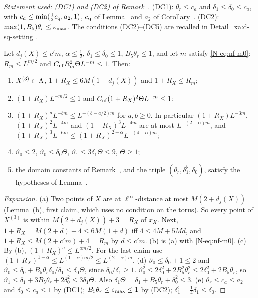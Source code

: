 \begin{detail}\label{xb:d-nf-small}
\emph{Statement used: (DC1) and (DC2) of Remark~.} (DC1): $\theta_r\le c_a$ and $\delta_1\le\delta_0\le c_a$, with $c_a\le\min(\frac12c_{\rm q},a_2,1)$, $c_{\rm q}$ of Lemma~ and $a_2$ of Corollary~. (DC2): $\max(1,B_5)\theta_r\le\varepsilon_{\max}$. The conditions (DC2)--(DC5) are recalled in Detail~\ref{xa:d-sq-setting}.

Let $d_j(X)\le c'm$, $\alpha\le\frac12$, $\delta_1\le\delta_0\le1$, $B_5\theta_r\le1$, and let $m$ satisfy \eqref{N-eq:nf-m0}: $R_m\le L^{m/2}$ and $C_{\rm nf}R_m^2\Theta L^{-m}\le1$. Then:
\begin{enumerate}[label=(\alph*)]
\item $X^{(3)}\subset\Lambda$, $1+R_X\le6M(1+d_j(X))$ and $1+R_X\le R_m$;
\item $(1+R_X)L^{-m/2}\le1$ and $C_{\rm nf}(1+R_X)^2\Theta L^{-m}\le1$;
\item $(1+R_X)^aL^{-bm}\le L^{-(b-a/2)m}$ for $a,b\ge0$. In particular $(1+R_X)L^{-3m}$, $(1+R_X)^2L^{-4m}$ and $(1+R_X)^3L^{-4m}$ are at most $L^{-(2+\alpha)m}$, and $(1+R_X)^3L^{-6m}\le(1+R_X)^{2+\alpha}L^{-(4+\alpha)m}$;
\item $\vartheta_0\le2$, $\vartheta_0\le\delta_0\Theta$, $\vartheta_1\le3\delta_1\Theta\le9$, $\Theta\ge1$;
\item the domain constants of Remark~, and the triple $(\theta_r,\delta_1^\flat,\delta_0)$, satisfy the hypotheses of Lemma~.
\end{enumerate}
\end{detail}

\begin{proof}[Expansion]
(a) Two points of $X$ are at $\ell^\infty$-distance at most $M(2+d_j(X))$ (Lemma~(b), first claim, which uses no condition on the torus). So every point of $X^{(3)}$ is within $M(2+d_j(X))+3=R_X$ of $x_X$. Next, $1+R_X=M(2+d)+4\le6M(1+d)$ iff $4\le4M+5Md$, and $1+R_X\le M(2+c'm)+4=R_m$ by $d\le c'm$.
(b) is (a) with \eqref{N-eq:nf-m0}.
(c) By (b), $(1+R_X)^a\le L^{am/2}$. For the last claim use $(1+R_X)^{1-\alpha}\le L^{(1-\alpha)m/2}\le L^{(2-\alpha)m}$.
(d) $\vartheta_0\le\delta_0+1\le2$ and $\vartheta_0\le\delta_0+B_5\theta_r\delta_0/\delta_1\le\delta_0\Theta$, since $\delta_0/\delta_1\ge1$. $\vartheta_0^2\le2\delta_0^2+2B_5^2\theta_r^2\le2\delta_0^2+2B_5\theta_r$, so $\vartheta_1\le\delta_1+3B_5\theta_r+2\delta_0^2\le3\delta_1\Theta$. Also $\delta_1\Theta=\delta_1+B_5\theta_r+\delta_0^2\le3$.
(e) $\theta_r\le c_a\le a_2$ and $\delta_0\le c_a\le1$ by (DC1); $B_5\theta_r\le\varepsilon_{\max}\le1$ by (DC2); $\delta_1^\flat=\frac14\delta_1\le\delta_0$.
\end{proof}

